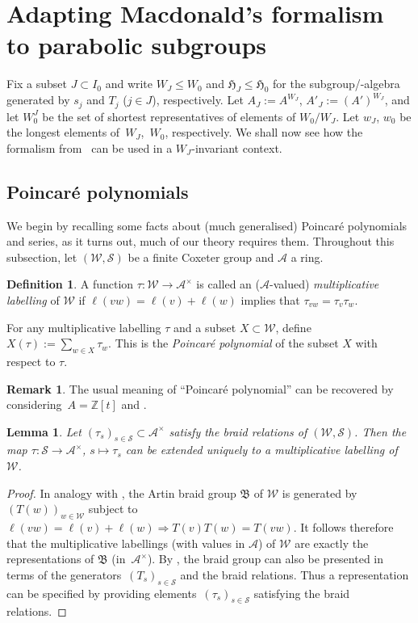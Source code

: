 \documentclass[10pt,a4paper]{amsart}
\newtheorem{Lemma}[Theorem]{Lemma}
\theoremstyle{definition}
\newtheorem{Definition}[Theorem]{Definition}
\newtheorem{Remark}[Theorem]{Remark}
\numberwithin{equation}{section}
\begin{document}
\section{Adapting Macdonald's formalism to parabolic subgroups}\label{sec:macdo-parabolic}
Fix a subset $J\subset I_0$ and write $W_J\le W_0$ and $\mathfrak{H}_J\le\mathfrak{H}_0$ for
the subgroup/-algebra generated by $s_j$ and $T_j$ ($j\in J$), respectively. Let
$A_J := A^{W_J}$, $A'_J:= (A')^{W_J}$, and let $W_0^J$ be the set of shortest representatives of elements of $W_0/W_J$. Let
$w_J$, $w_0$ be the longest elements of~$W_J$,~$W_0$, respectively. We shall now
see how the formalism from~\cite{macdonald} can be used in a $W_J$-invariant
context.

\subsection{Poincar\'e polynomials}
We begin by recalling some facts about (much generalised) Poincar\'e
polynomials and series, as it turns out, much of our theory requires them.
Throughout this subsection, let $(\mathcal{W},\mathcal{S})$ be a finite Coxeter group and
$\mathcal{A}$ a ring.

\begin{Definition}
 A function
 $\tau\colon \mathcal{W}\to \mathcal{A}^\times$ is called
 an ($\mathcal{A}$-valued) \emph{multiplicative labelling} of $\mathcal{W}$ if $\ell(vw)=\ell(v)+\ell(w)$ implies that
 $\tau_{vw}=\tau_v\tau_w$.

 For any multiplicative labelling $\tau$ and a subset $X\subset \mathcal{W}$, define
$
 X(\tau) := \sum_{w\in X} \tau_w$.
 This is the \emph{Poincar\'e polynomial} of the subset $X$ with respect to $\tau$.
\end{Definition}

\begin{Remark}
 The usual meaning of ``Poincar\'e polynomial'' can be recovered by
 considering~${A=\mathbb{Z}[t]}$ and .
\end{Remark}

\begin{Lemma}\label{sec:lem-construct-labelling}
 Let $(\tau_s)_{s\in \mathcal{S}}\subset \mathcal{A}^\times$ satisfy the braid relations of $(\mathcal{W},\mathcal{S})$.
Then the map $\tau\colon \mathcal{S}\to \mathcal{A}^\times$, $s\mapsto \tau_s$ can be extended
 uniquely to a multiplicative labelling of~$\mathcal{W}$.
\end{Lemma}
\begin{proof}
 In analogy with \cite[Section~3.1]{macdonald}, the Artin braid group
 $\mathfrak{B}$ of $\mathcal{W}$ is generated by $(T(w))_{w\in \mathcal{W}}$ subject to
$
 \ell(vw)=\ell(v)+\ell(w)\Rightarrow T(v)T(w)=T(vw)$.
 It follows therefore that the multiplicative labellings (with values in
 $\mathcal{A}$) of $\mathcal{W}$ are exactly the representations of
 $\mathfrak{B}$ (in~$\mathcal{A}^\times$). By
 \cite[Section~3.1.6]{macdonald}, the braid group can also be
 presented in terms of the generators~$(T_s)_{s\in \mathcal{S}}$ and the braid
 relations. Thus a representation can be specified by providing
 elements~$(\tau_s)_{s\in\mathcal{S}}$ satisfying the braid relations.
\end{proof}
\end{document}
